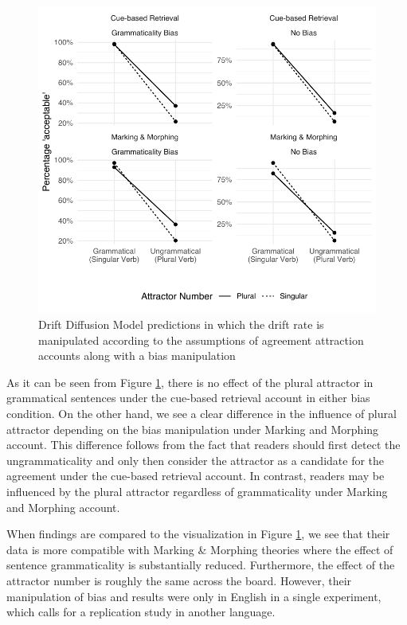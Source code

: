 \begin{knitrout}
\color{fgcolor}\begin{figure}[hbt!]

{\centering \includegraphics[width=\linewidth]{figure/ddmSimulation-1} 

}

\caption{Drift Diffusion Model predictions in which the drift rate is manipulated according to the assumptions of agreement attraction accounts along with a bias manipulation}\label{fig:ddmSimulation}
\end{figure}

\end{knitrout}


As it can be seen from Figure \ref{fig:ddmSimulation}, there is no effect of the plural attractor in grammatical sentences under the cue-based retrieval account in either bias condition. On the other hand, we see a clear difference in the influence of plural attractor depending on the bias manipulation under Marking and Morphing account. This difference follows from the fact that readers should first detect the ungrammaticality and only then consider the attractor as a candidate for the agreement under the cue-based retrieval account. In contrast, readers may be influenced by the plural attractor regardless of grammaticality under Marking and Morphing account.

When \cites{HammerlyEtAl2019} findings are compared to the visualization in Figure \ref{fig:ddmSimulation}, we see that their data is more compatible with Marking \& Morphing theories where the effect of sentence grammaticality is substantially reduced. Furthermore, the effect of the attractor number is roughly the same across the board. However, their manipulation of bias and results were only in English in a single experiment, which calls for a replication study in another language.

